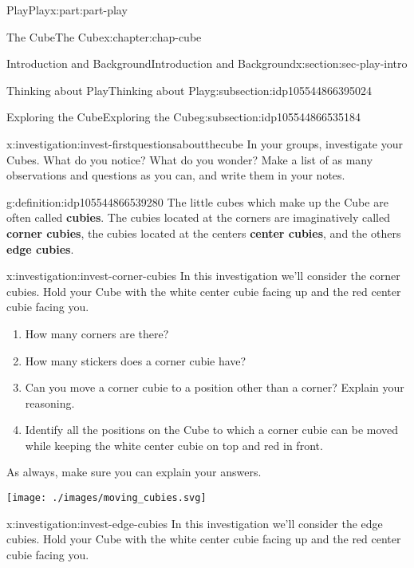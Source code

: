 \documentclass[oneside,10pt,]{book}
\newcommand{\terminology}[1]{\textbf{#1}}
\numberwithin{equation}{section}
\begin{document}
\begin{partptx}{Play}{}{Play}{}{}{x:part:part-play}
\begin{chapterptx}{The Cube}{}{The Cube}{}{}{x:chapter:chap-cube}
\begin{sectionptx}{Introduction and Background}{}{Introduction and Background}{}{}{x:section:sec-play-intro}
\begin{subsectionptx}{Thinking about Play}{}{Thinking about Play}{}{}{g:subsection:idp105544866395024}
\end{subsectionptx}
%
%
\typeout{************************************************}
\typeout{************************************************}
%
\begin{subsectionptx}{Exploring the Cube}{}{Exploring the Cube}{}{}{g:subsection:idp105544866535184}
\begin{investigation}{}{x:investigation:invest-firstquestionsaboutthecube}%
In your groups, investigate your Cubes. What do you notice? What do you wonder? Make a list of as many observations and questions as you can, and write them in your notes.%
\end{investigation}%
\begin{definition}{}{g:definition:idp105544866539280}%
%
%
%
%
The little cubes which make up the Cube are often called \terminology{cubies}. The cubies located at the corners are imaginatively called \terminology{corner cubies}, the cubies located at the centers \terminology{center cubies}, and the others \terminology{edge cubies}.%
\end{definition}
\begin{investigation}{}{x:investigation:invest-corner-cubies}%
In this investigation we'll consider the corner cubies. Hold your Cube with the white center cubie facing up and the red center cubie facing you.%
\begin{enumerate}
\item{}How many corners are there?%
\item{}How many stickers does a corner cubie have?%
\item{}Can you move a corner cubie to a position other than a corner? Explain your reasoning.%
\item{}Identify all the positions on the Cube to which a corner cubie can be moved while keeping the white center cubie on top and red in front.%
\end{enumerate}
As always, make sure you can explain your answers.%
\begin{image}{0.25}{0.5}{0.25}%
\texttt{[image: ./images/moving\_cubies.svg]}
\end{image}%
\end{investigation}%
\begin{investigation}{}{x:investigation:invest-edge-cubies}%
In this investigation we'll consider the edge cubies. Hold your Cube with the white center cubie facing up and the red center cubie facing you.%

\end{investigation}
\end{subsectionptx}
\end{sectionptx}
\end{chapterptx}
\end{partptx}
\end{document}
